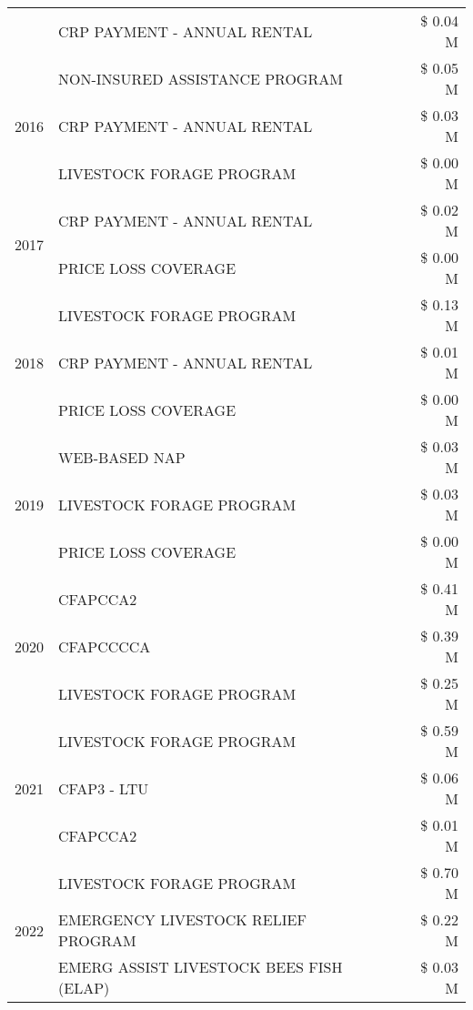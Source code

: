 \begin{tabular}{llr}
 & CRP PAYMENT - ANNUAL RENTAL & \$ 0.04 M \\
\cline{1-3}
\multirow[t]{3}{*}{2016} & NON-INSURED ASSISTANCE PROGRAM & \$ 0.05 M \\
 & CRP PAYMENT - ANNUAL RENTAL & \$ 0.03 M \\
 & LIVESTOCK FORAGE PROGRAM & \$ 0.00 M \\
\cline{1-3}
\multirow[t]{2}{*}{2017} & CRP PAYMENT - ANNUAL RENTAL & \$ 0.02 M \\
 & PRICE LOSS COVERAGE & \$ 0.00 M \\
\cline{1-3}
\multirow[t]{3}{*}{2018} & LIVESTOCK FORAGE PROGRAM & \$ 0.13 M \\
 & CRP PAYMENT - ANNUAL RENTAL & \$ 0.01 M \\
 & PRICE LOSS COVERAGE & \$ 0.00 M \\
\cline{1-3}
\multirow[t]{3}{*}{2019} & WEB-BASED NAP & \$ 0.03 M \\
 & LIVESTOCK FORAGE PROGRAM & \$ 0.03 M \\
 & PRICE LOSS COVERAGE & \$ 0.00 M \\
\cline{1-3}
\multirow[t]{3}{*}{2020} & CFAPCCA2 & \$ 0.41 M \\
 & CFAPCCCCA & \$ 0.39 M \\
 & LIVESTOCK FORAGE PROGRAM & \$ 0.25 M \\
\cline{1-3}
\multirow[t]{3}{*}{2021} & LIVESTOCK FORAGE PROGRAM & \$ 0.59 M \\
 & CFAP3 - LTU & \$ 0.06 M \\
 & CFAPCCA2 & \$ 0.01 M \\
\cline{1-3}
\multirow[t]{3}{*}{2022} & LIVESTOCK FORAGE PROGRAM & \$ 0.70 M \\
 & EMERGENCY LIVESTOCK RELIEF PROGRAM & \$ 0.22 M \\
 & EMERG ASSIST LIVESTOCK BEES FISH (ELAP) & \$ 0.03 M \\
\cline{1-3}
\bottomrule
\end{tabular}

